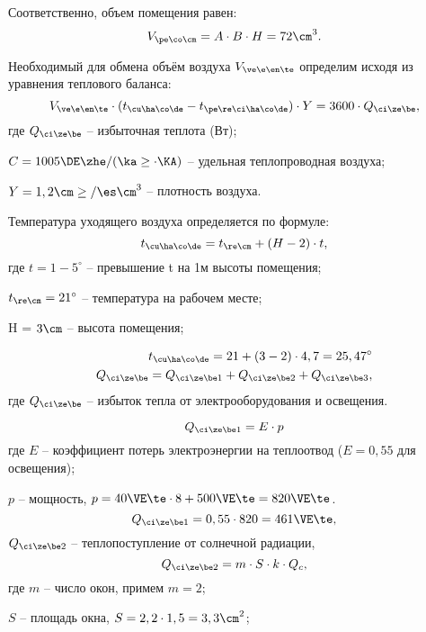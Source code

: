 Соответственно, объем помещения равен: 
\begin{equation*}
	V_{\pe\co\cm} = A \cdot B \cdot H = 72 \cm^3.
\end{equation*}

Необходимый для обмена объём воздуха $V_{\ve\e\en\te}$ определим исходя из уравнения теплового баланса:
\begin{equation*}
	V_{\ve\e\en\te} \cdot (t_{\cu\ha\co\de} - t_{\pe\re\ci\ha\co\de}) \cdot Y = 3600 \cdot Q_{\ci\ze\be},
\end{equation*}
где $Q_{\ci\ze\be}$ -- избыточная теплота (Вт);

$C = 1005 \DE\zhe / (\ka\ge \cdot \KA)$ -- удельная теплопроводная воздуха;

$Y = 1,2 \cm\ge / \es\cm^3$ -- плотность воздуха.

Температура уходящего воздуха определяется по формуле:
\begin{equation*}
	t_{\cu\ha\co\de} = t_{\re\cm} + (H - 2) \cdot t,
\end{equation*}
где $t = 1-5^\circ$ -- превышение t на 1м высоты помещения;

$t_{\re\cm} = 21^\circ$ -- температура на рабочем месте;

H = $3 \cm$ -- высота помещения;

\begin{eqnarray*}
	t_{\cu\ha\co\de} = 21 + (3 - 2) \cdot 4,7 = 25,47^\circ \\
	Q_{\ci\ze\be} = Q_{\ci\ze\be1} + Q_{\ci\ze\be2} + Q_{\ci\ze\be3},
\end{eqnarray*}
где $Q_{\ci\ze\be}$ -- избыток тепла от электрооборудования и освещения.

\begin{equation*}
	Q_{\ci\ze\be1} = E \cdot p
\end{equation*}
где $E$ -- коэффициент потерь электроэнергии на теплоотвод ($E = 0,55$ для освещения);

$p$ -- мощность, $p = 40 \VE\te \cdot 8 + 500 \VE\te = 820\VE\te$.
\begin{equation*}
	Q_{\ci\ze\be1} = 0,55 \cdot 820 = 461 \VE\te,
\end{equation*}
$Q_{\ci\ze\be2}$ -- теплопоступление от солнечной радиации,
\begin{equation*}
	Q_{\ci\ze\be2} = m \cdot S \cdot k \cdot Q_c,
\end{equation*}
где $m$ -- число окон, примем $m = 2$;

$S$ -- площадь окна, $S = 2,2 \cdot 1,5 = 3,3 \cm^2$;

